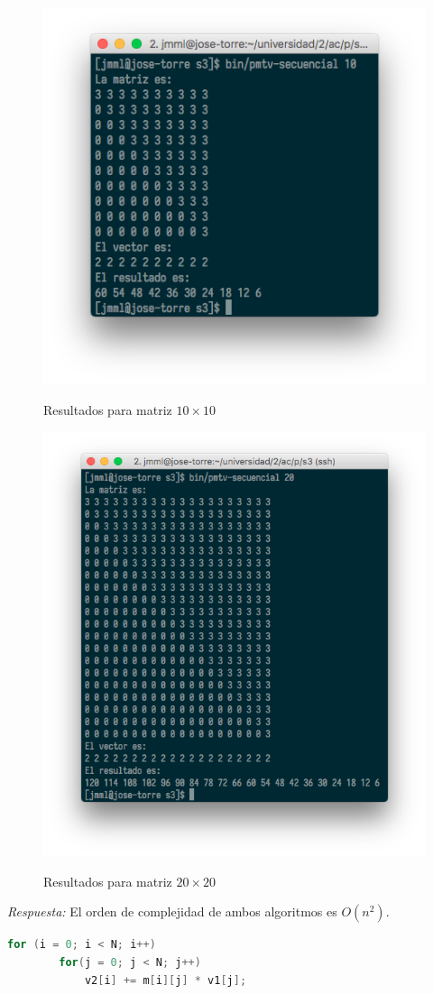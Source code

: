 \documentclass[11pt]{article}
\theoremstyle{definition-style}
\begin{document}


\begin{figure}[H]
    \centering
        \caption{Resultados para matriz $10 \times 10$}
    \includegraphics[width=0.6\linewidth]{./img/61.png}
    \label{fig:}
\end{figure}

\begin{figure}[H]
    \centering
    \caption{Resultados para matriz $20 \times 20$}
    \includegraphics[width=0.7\linewidth]{./img/62.png}
    \label{fig:}
\end{figure}

\emph{Respuesta:} El orden de complejidad de ambos algoritmos es $O(n^2)$.

\begin{lstlisting}[language=C, caption=Producto de matriz por vector]
    for (i = 0; i < N; i++)
        for(j = 0; j < N; j++)
            v2[i] += m[i][j] * v1[j];
\end{lstlisting}
\end{document}
